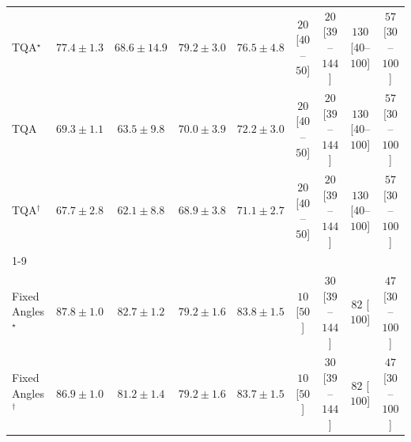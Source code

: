 \begin{tabular}{l|cccc|cccc|}
TQA$^\star$ & {\cellcolor[HTML]{D85A09}} \color[HTML]{F1F1F1} $77.4\pm 1.3$ & {\cellcolor[HTML]{FEAA38}} \color[HTML]{000000} $68.6\pm 14.9$ & {\cellcolor[HTML]{CB4B02}} \color[HTML]{F1F1F1} $79.2\pm 3.0$ & {\cellcolor[HTML]{DF620D}} \color[HTML]{F1F1F1} $76.5\pm 4.8$ & {\cellcolor[HTML]{FFF4F0}} \color[HTML]{000000} $20$ [$40$--$50$] & {\cellcolor[HTML]{FFF4F0}} \color[HTML]{000000} $20$ [$39$--$144$] & {\cellcolor[HTML]{FDDBD7}} \color[HTML]{000000} $130$ [$40$--$100$] & {\cellcolor[HTML]{FEECE9}} \color[HTML]{000000} $57$ [$30$--$100$] \\
TQA & {\cellcolor[HTML]{FEA332}} \color[HTML]{000000} $69.3\pm 1.1$ & {\cellcolor[HTML]{FED471}} \color[HTML]{000000} $63.5\pm 9.8$ & {\cellcolor[HTML]{FE9C2C}} \color[HTML]{000000} $70.0\pm 3.9$ & {\cellcolor[HTML]{F68820}} \color[HTML]{F1F1F1} $72.2\pm 3.0$ & {\cellcolor[HTML]{FFF4F0}} \color[HTML]{000000} $20$ [$40$--$50$] & {\cellcolor[HTML]{FFF4F0}} \color[HTML]{000000} $20$ [$39$--$144$] & {\cellcolor[HTML]{FDDBD7}} \color[HTML]{000000} $130$ [$40$--$100$] & {\cellcolor[HTML]{FEECE9}} \color[HTML]{000000} $57$ [$30$--$100$] \\
TQA$^\dagger$ & {\cellcolor[HTML]{FEB23F}} \color[HTML]{000000} $67.7\pm 2.8$ & {\cellcolor[HTML]{FEDE86}} \color[HTML]{000000} $62.1\pm 8.8$ & {\cellcolor[HTML]{FEA736}} \color[HTML]{000000} $68.9\pm 3.8$ & {\cellcolor[HTML]{FB9225}} \color[HTML]{000000} $71.1\pm 2.7$ & {\cellcolor[HTML]{FFF4F0}} \color[HTML]{000000} $20$ [$40$--$50$] & {\cellcolor[HTML]{FFF4F0}} \color[HTML]{000000} $20$ [$39$--$144$] & {\cellcolor[HTML]{FDDBD7}} \color[HTML]{000000} $130$ [$40$--$100$] & {\cellcolor[HTML]{FEECE9}} \color[HTML]{000000} $57$ [$30$--$100$] \\
\cline{1-9}
\multicolumn{9}{c}{\rule{0pt}{8pt}PP} \\
\midrule
Fixed Angles$^\star$ & {\cellcolor[HTML]{00472A}} \color[HTML]{F1F1F1} $87.8\pm 1.0$ & {\cellcolor[HTML]{076D39}} \color[HTML]{F1F1F1} $82.7\pm 1.2$ & {\cellcolor[HTML]{228343}} \color[HTML]{F1F1F1} $79.2\pm 1.6$ & {\cellcolor[HTML]{006636}} \color[HTML]{F1F1F1} $83.8\pm 1.5$ & {\cellcolor[HTML]{FFF7F3}} \color[HTML]{000000} $10$ [$50$] & {\cellcolor[HTML]{FFF2EE}} \color[HTML]{000000} $30$ [$39$--$144$] & {\cellcolor[HTML]{FEE6E3}} \color[HTML]{000000} $82$ [$100$] & {\cellcolor[HTML]{FEEEEB}} \color[HTML]{000000} $47$ [$30$--$100$] \\
Fixed Angles$^\dagger$ & {\cellcolor[HTML]{004E2D}} \color[HTML]{F1F1F1} $86.9\pm 1.0$ & {\cellcolor[HTML]{13773D}} \color[HTML]{F1F1F1} $81.2\pm 1.4$ & {\cellcolor[HTML]{228343}} \color[HTML]{F1F1F1} $79.2\pm 1.6$ & {\cellcolor[HTML]{006737}} \color[HTML]{F1F1F1} $83.7\pm 1.5$ & {\cellcolor[HTML]{FFF7F3}} \color[HTML]{000000} $10$ [$50$] & {\cellcolor[HTML]{FFF2EE}} \color[HTML]{000000} $30$ [$39$--$144$] & {\cellcolor[HTML]{FEE6E3}} \color[HTML]{000000} $82$ [$100$] & {\cellcolor[HTML]{FEEEEB}} \color[HTML]{000000} $47$ [$30$--$100$] \\

\end{tabular}
